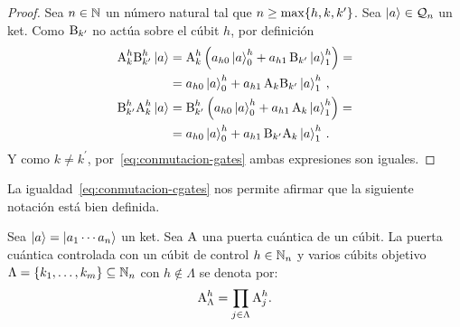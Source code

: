 \begin{proof}
  Sea $n\in\mathbb{N}$ un número natural tal que $n\geq\max\{h,k,k^\prime\}$.
  Sea $\ket{a}\in\mathcal{Q}_n$ un ket. Como $\text{B}_{k^\prime}$ no actúa sobre el cúbit $h$, por definición
  \begin{equation*}
    \begin{split}
      \text{A}^{h}_{k}\text{B}^{h}_{k^\prime}\ket{a}
       & = \text{A}^{h}_{k}\left(a_{h0}\ket{a}^{h}_{0}+a_{h1}\,\text{B}_{k^\prime}\ket{a}^{h}_{1}\right)=   \\
       & =a_{h0}\ket{a}^{h}_{0}+a_{h1}\,\text{A}_k\text{B}_{k^\prime}\ket{a}^{h}_{1}\,,                      \\
      \text{B}^{h}_{k^\prime}\text{A}^{h}_{k}\ket{a}
       & = \text{B}^{h}_{k^\prime}\left(a_{h0}\ket{a}^{h}_{0}+a_{h1}\,\text{A}_k\ket{a}^{h}_{1}\right)= \\
       & =a_{h0}\ket{a}^{h}_{0}+a_{h1}\,\text{B}_{k^\prime}\text{A}_k\ket{a}^{h}_{1}\,.
    \end{split}
  \end{equation*}
  Y como $k\neq k^\prime$, por~\eqref{eq:conmutacion-gates} ambas expresiones son iguales.
\end{proof}

La igualdad~\eqref{eq:conmutacion-cgates} nos permite afirmar que la siguiente notación está bien definida.
\begin{notation}
  Sea $\ket{a}=\ket{a_1\cdots a_n}$ un ket.
  Sea $\text{A}$ una puerta cuántica de un cúbit.
  La puerta cuántica controlada con un cúbit de control $h\in\mathbb{N}_n$ y varios cúbits objetivo $\Lambda=\{k_1,\dots,k_m\}\subseteq\mathbb{N}_n$ con $h\not\in\Lambda$ se denota por:
  \begin{equation}
    \label{eq:ccontrol-1-n}
    \text{A}^{h}_{\Lambda} =\prod_{j\in\Lambda}\text{A}^{h}_{j}.
  \end{equation}
\end{notation}

